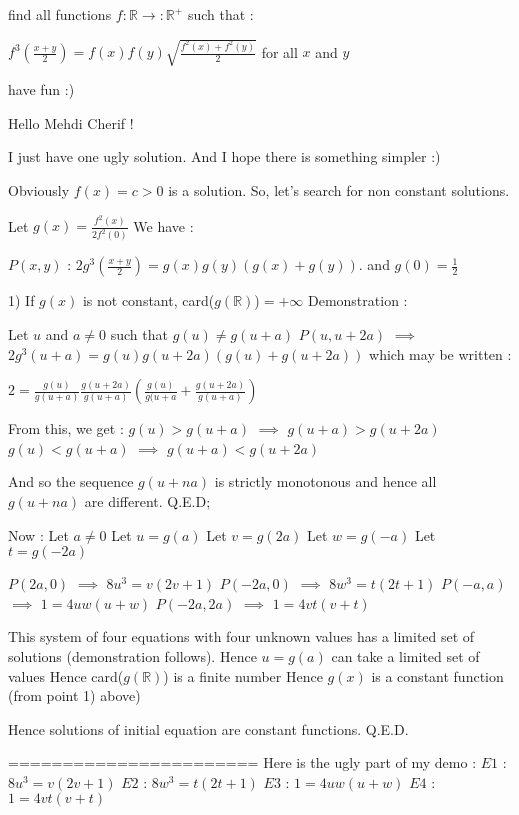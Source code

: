 \begin{solution}
	\begin{tcolorbox}find all functions $ f: \mathbb{R}\rightarrow: \mathbb{R^{ + }}$ such that :

$ f^3(\frac {x + y}{2}) = f(x)f(y)\sqrt {\frac {f^2(x) + f^2(y)}{2}}$ for all $ x$ and $ y$

have fun :)\end{tcolorbox}

Hello Mehdi Cherif !

I just have one ugly solution. And I hope there is something simpler :)

Obviously $ f(x)=c>0$ is a solution. So, let's search for non constant solutions.

Let $ g(x)=\frac{f^2(x)}{2f^2(0)}$ We have :

$ P(x,y)$ : $ 2g^3(\frac{x+y}{2})=g(x)g(y)(g(x)+g(y))$. and $ g(0)=\frac{1}{2}$

1) If $ g(x)$ is not constant, card($ g(\mathbb{R})$)$ =+\infty$
Demonstration :

Let $ u$ and $ a\neq 0$ such that $ g(u)\neq g(u+a)$
$ P(u,u+2a)$ $ \implies$ $ 2g^3(u+a)=g(u)g(u+2a)(g(u)+g(u+2a))$ which may be written :

$ 2=\frac{g(u)}{g(u+a)}\frac{g(u+2a)}{g(u+a)}(\frac{g(u)}{g(u+a}+\frac{g(u+2a)}{g(u+a)})$

From this, we get :
${ g(u)}>g(u+a)$ $ \implies$ $ g(u+a)>g(u+2a)$
${ g(u)}<g(u+a)$ $ \implies$ $ g(u+a)<g(u+2a)$

And so the sequence $ g(u+na)$ is strictly monotonous and hence all $ g(u+na)$ are different.
Q.E.D;

Now :
Let $ a\neq 0$
Let $ u=g(a)$
Let $ v=g(2a)$
Let $ w=g(-a)$
Let $ t=g(-2a)$

$ P(2a,0)$ $ \implies$ $ 8u^3 = v(2v+1)$
$ P(-2a,0)$ $ \implies$ $ 8w^3 = t(2t+1)$
$ P(-a,a)$ $ \implies$ $ 1 = 4uw(u+w)$
$ P(-2a,2a)$ $ \implies$ $ 1 = 4vt(v+t)$

This system of four equations with four unknown values has a limited set of solutions (demonstration follows).
Hence $ u=g(a)$ can take a limited set of values
Hence card($ g(\mathbb{R})$) is a finite number
Hence $ g(x)$ is a constant function (from point 1) above)

Hence solutions of initial equation are constant functions.
Q.E.D.

=======================
Here is the ugly part of my demo :
$ E1$ : $ 8u^3 = v(2v+1)$
$ E2$ : $ 8w^3 = t(2t+1)$
$ E3$ : $ 1 = 4uw(u+w)$
$ E4$ : $ 1 = 4vt(v+t)$


\end{solution}
